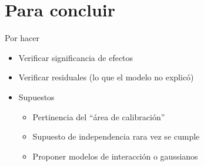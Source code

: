 \documentclass[
  11pt,
  ignorenonframetext,
]{beamer}
\providecommand{\tightlist}{%
  \setlength{\itemsep}{0pt}\setlength{\parskip}{0pt}}
\begin{document}
\hypertarget{para-concluir}{%
\section{Para concluir}\label{para-concluir}}

\begin{frame}{Por hacer}
\protect\hypertarget{por-hacer}{}
\begin{itemize}
\item
  Verificar significancia de efectos
\item
  Verificar residuales (lo que el modelo no explicó)
\item
  Supuestos

  \begin{itemize}
  \tightlist
  \item
    Pertinencia del ``área de calibración''
  \item
    Supuesto de independencia rara vez se cumple
  \item
    Proponer modelos de interacción o gaussianos
  \end{itemize}
\end{itemize}
\end{frame}
\end{document}
